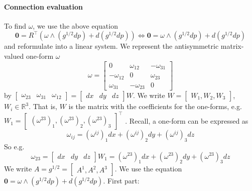 \documentclass[../thesis.tex]{subfiles}
\begin{document}
\paragraph{Connection evaluation}
To find $\omega$, we use the above equation
$$ \bm{0} = R^{\top}(\omega \wedge (g^{1/2}dp)+ d(g^{1/2}dp)) \iff \bm{0} = \omega \wedge (g^{1/2}dp)+ d(g^{1/2}dp)$$
and reformulate into a linear system.
We represent the antisymmetric matrix-valued one-form $\omega$
$$\omega = \begin{bmatrix}
 0 & \omega_{12} & -\omega_{31} \\
 -\omega_{12} & 0 & \omega_{23} \\
 \omega_{31} & -\omega_{23} & 0
\end{bmatrix}$$
by $
\begin{bmatrix}
  \omega_{23} & \omega_{31} & \omega_{12}
\end{bmatrix} = 
\begin{bmatrix}
  dx & dy & dz
\end{bmatrix} W$. We write $W=\begin{bmatrix}
  W_1,W_2,W_3
\end{bmatrix}$, $W_i \in \mathbb{R}^3$. That is, $W$ is the matrix with the coefficients for the one-forms, e.g.
$W_1 = \begin{bmatrix}
  (\omega^{23})_1, (\omega^{23})_2, (\omega^{23})_3
\end{bmatrix}^{\top}$
.
Recall, a one-form can be expressed as
$$
\omega_{ij}= (\omega^{ij})_1dx + (\omega^{ij})_2dy + (\omega^{ij})_3dz
$$
So e.g. $$\omega_{23} = \begin{bmatrix}
  dx & dy & dz
\end{bmatrix}W_1 = (\omega^{23})_1dx + (\omega^{23})_2dy + (\omega^{23})_3dz$$
We write $A = g^{1/2}= \begin{bmatrix}
  A^1, A^2, A^3
\end{bmatrix}$.
We use the equation $\bm{0} = \omega \wedge (g^{1/2}dp)+ d(g^{1/2}dp)$.
First part:
\end{document}

